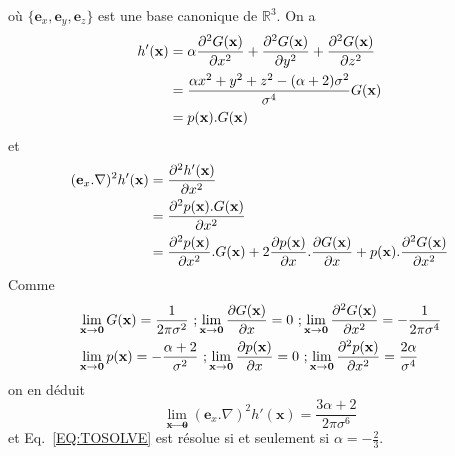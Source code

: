 où $\{\textbf{e}_x, \textbf{e}_y, \textbf{e}_z\}$ est une base canonique de  $\mathbb  R^3$.
On a
\begin{align}
h'(\textbf{x}) & =   \alpha  \frac{\partial ^{2}G(\textbf{x})}{\partial x^2} + \frac{\partial ^{2}G(\textbf{x})}{\partial y^2} + \frac{\partial ^{2}G(\textbf{x})}{\partial z^2} \nonumber \\ 
& = \frac{\alpha x^2 + y^2 + z^2 - (\alpha+2) \sigma^2}{\sigma^4} G(\textbf{x}) \\
& = p(\textbf{x}).G(\textbf{x})
\nonumber
\end{align}
et
\begin{align}
    (\textbf{e}_x.\nabla)^2 h'(\textbf{x}) &= \frac{\partial ^{2}h'(\textbf{x})}{\partial x^2} \\
    & = \frac{\partial ^{2}p(\textbf{x}).G(\textbf{x})}{\partial x^2} \nonumber\\
    & = \frac{\partial ^{2}p(\textbf{x})}{\partial x^2} .G(\textbf{x}) + 2 \frac{\partial p(\textbf{x})}{\partial x} . \frac{\partial G(\textbf{x})}{\partial x} + p(\textbf{x}). \frac{\partial ^{2}G(\textbf{x})}{\partial x^2} \nonumber
\end{align}
Comme
\begin{align}
    &\lim_{\textbf{x}\to \textbf{0}} G(\textbf{x}) = \frac{1}{2 \pi \sigma^2}~; 
    \lim_{\textbf{x}\to \textbf{0}} \frac{\partial G(\textbf{x})}{\partial x}  = 0~; 
    \lim_{\textbf{x}\to \textbf{0}} \frac{\partial ^{2}G(\textbf{x})}{\partial x^{2}}  = -\frac{1}{2 \pi \sigma^4} \nonumber\\
    &\lim_{\textbf{x}\to \textbf{0}} p(\textbf{x}) = - \frac{\alpha + 2}{\sigma^2}~; 
    \lim_{\textbf{x}\to \textbf{0}} \frac{\partial p(\textbf{x})}{\partial x}  = 0~; 
    \lim_{\textbf{x}\to \textbf{0}} \frac{\partial ^{2}p(\textbf{x})}{\partial x^{2}} = \frac{2 \alpha}{\sigma^4} \nonumber
\end{align}
on en déduit
\begin{equation}
\lim_{\textbf{x}\to \textbf{0}} (\textbf{e}_x.\nabla)^2 h'(\textbf{x}) = 
\frac{3\alpha + 2}{2 \pi \sigma^6} \nonumber
\end{equation}
et Eq.~\eqref{EQ:TOSOLVE} est résolue si et seulement si $\alpha = -\frac{2}{3}$.